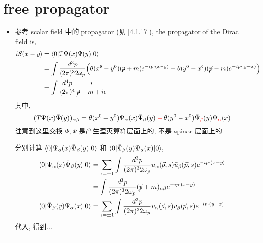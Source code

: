 \section{free propagator}
\begin{itemize}
	\item 参考 scalar field 中的 propagator (见 \eqref{4.1.17}), the propagator of the Dirac field is,
	\begin{align}
		i S(x - y) &= \braket{0 | T \Psi(x) \bar{\Psi}(y) | 0} \notag \\
		&= \int \frac{d^3 p}{(2 \pi)^3 2 \omega_p} \Big( \theta(x^0 - y^0) (\cancel{p} + m) e^{- i p \cdot (x - y)} - \theta(y^0 - x^0) (\cancel{p} - m) e^{- i p \cdot (y - x)} \Big) \notag \\
		&= \int \frac{d^4 p}{(2 \pi)^4} \frac{i}{\cancel{p} - m + i \epsilon}
	\end{align}
	其中,
	\begin{equation}
		(T \Psi(x) \bar{\Psi}(y))_{\alpha \beta} = \theta(x^0 - y^0) \Psi_\alpha(x) \bar{\Psi}_\beta(y) \mathcolor{red}{-} \theta(y^0 - x^0) \bar{\Psi}_{\mathcolor{red}{\beta}}(y) \Psi_{\mathcolor{red}{\alpha}}(x)
	\end{equation}
	注意到这里交换 $\Psi, \bar{\Psi}$ 是产生湮灭算符层面上的, 不是 spinor 层面上的.
	
	\begin{tcolorbox}[title=calculation:]
		分别计算 $\braket{0 | \Psi_\alpha(x) \bar{\Psi}_\beta(y) | 0}$ 和 $\braket{0 | \bar{\Psi}_\beta(y) \Psi_\alpha(x) | 0}$,
		\begin{align}
			\braket{0 | \Psi_\alpha(x) \bar{\Psi}_\beta(y) | 0} &= \sum_{s = \pm 1} \int \frac{d^3 p}{(2 \pi)^3 2 \omega_p} u_\alpha(\vec{p}, s) \bar{u}_\beta(\vec{p}, s) e^{- i p \cdot (x - y)} \notag \\
			&= \int \frac{d^3 p}{(2 \pi)^3 2 \omega_p} (\cancel{p} + m)_{\alpha \beta} e^{- i p \cdot (x - y)} \\
			\braket{0 | \bar{\Psi}_\beta(y) \Psi_\alpha(x) | 0} &= \sum_{s = \pm 1} \int \frac{d^3 p}{(2 \pi)^3 2 \omega_p} v_\alpha(\vec{p}, s) \bar{v}_\beta(\vec{p}, s) e^{- i p \cdot (y - x)}
		\end{align}
		代入, 得到...
		
		\noindent\rule[0.5ex]{\linewidth}{0.5pt} %
		

\end{tcolorbox}
\end{itemize}
